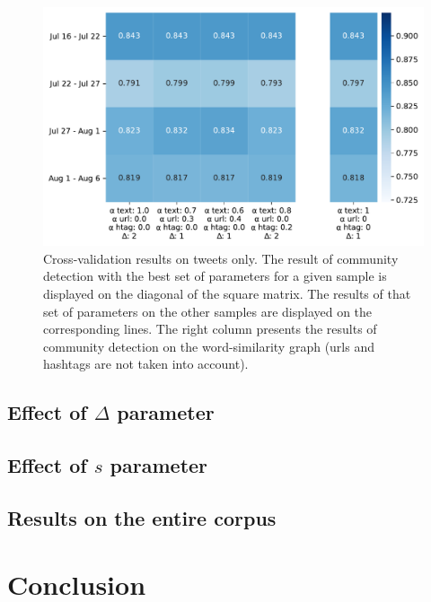  \begin{figure}
 \begin{center}
      \includegraphics[height=.38\textheight]{figures/louvain_macro_tfidf_tweets_only.pdf}
    \caption[Cross-validation results on tweets only]{Cross-validation results on tweets only. The result of community detection with the best set of parameters for a given sample is displayed on the diagonal of the square matrix. The results of that set of parameters on the other samples are displayed on the corresponding lines.
     The right column presents the results of community detection on the word-similarity graph (urls and hashtags are not taken into account).}
    \label{fig:louvain_macro_tweets}
 \end{center}
\end{figure}
\subsection{Effect of $\Delta$ parameter}
\subsection{Effect of $s$ parameter}
\subsection{Results on the entire corpus}
\label{Joint_results}

\section{Conclusion}
